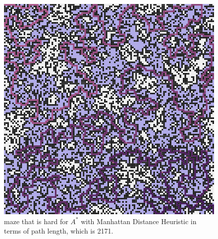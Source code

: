 \documentclass[letter]{article}
\begin{document}
\begin{enumerate}[resume]
\begin{enumerate}
\begin{enumerate}
\begin{figure}
					\includegraphics[width=\textwidth]{../pics/amp/2171.png}
					\caption{\label{fig:amp1}maze that is hard for $ A^* $ with Manhattan Distance Heuristic in terms of path length, which is 2171.}
					

\end{figure}
\end{enumerate}
\end{enumerate}
\end{enumerate}
\end{document}
